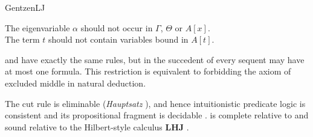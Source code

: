 \begin{entry}{GentzenLJ}
\begin{calculus}
\centering
The eigenvariable $\alpha$ should not occur in $\Gamma$, $\Theta$ or $A[x]$. \\ 
The term $t$ should not contain variables bound in $A[t]$.
\end{calculus}


\begin{clarifications}
\LJ and \LK {} have exactly the same rules, 
but in \LJ the succedent of every sequent may have at most one formula.
This restriction is equivalent to
forbidding the axiom of excluded middle in natural deduction.
\end{clarifications}


\newcommand{\LHJ}{\ensuremath{\mathbf{LHJ}}\xspace}

\begin{technicalities}
The cut rule is eliminable (\emph{Hauptsatz} \cite{Gentzen1935}), and hence intuitionistic predicate logic is consistent and its propositional fragment is decidable \cite{Gentzen1935a}. \LJ is complete relative to \NJ {} and sound relative to the Hilbert-style calculus \LHJ {} \cite{Gentzen1935a}.
\end{technicalities}


\end{entry}
